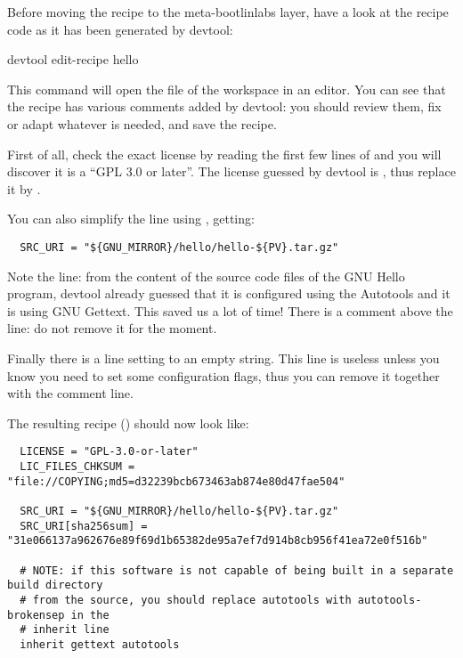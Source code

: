 Before moving the recipe to the meta-bootlinlabs layer, have a look at the
recipe code as it has been generated by devtool:

\begin{bashinput}
devtool edit-recipe hello
\end{bashinput}

This command will open the  file of the workspace in an
editor. You can see that the recipe has various comments added by devtool:
you should review them, fix or adapt whatever is needed, and save the
recipe.

First of all, check the exact license by reading the first few lines of
 and you will discover it is a
``GPL 3.0 or later''. The license guessed by devtool is
, thus replace it by .

You can also simplify the  line using ,
getting:
\begin{verbatim}
  SRC_URI = "${GNU_MIRROR}/hello/hello-${PV}.tar.gz"
\end{verbatim}

Note the  line: from the content of the source code files of
the GNU Hello program, devtool already guessed that it is configured using
the Autotools and it is using GNU Gettext. This saved us a lot of time!
There is a comment above the  line: do not remove it for the
moment.

Finally there is a line setting  to an empty
string. This line is useless unless you know you need to set some
configuration flags, thus you can remove it together with the comment line.

The resulting recipe () should
now look like:
\begin{verbatim}
  LICENSE = "GPL-3.0-or-later"
  LIC_FILES_CHKSUM = "file://COPYING;md5=d32239bcb673463ab874e80d47fae504"

  SRC_URI = "${GNU_MIRROR}/hello/hello-${PV}.tar.gz"
  SRC_URI[sha256sum] = "31e066137a962676e89f69d1b65382de95a7ef7d914b8cb956f41ea72e0f516b"

  # NOTE: if this software is not capable of being built in a separate build directory
  # from the source, you should replace autotools with autotools-brokensep in the
  # inherit line
  inherit gettext autotools
\end{verbatim}

